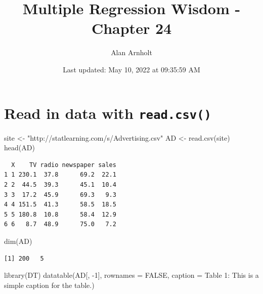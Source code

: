 \documentclass[
]{article}
\title{Multiple Regression Wisdom - Chapter 24}
\author{Alan Arnholt}
\date{Last updated: May 10, 2022 at 09:35:59 AM}
\newenvironment{Shaded}{\begin{snugshade}}{\end{snugshade}}
\newcommand{\AttributeTok}[1]{\textcolor[rgb]{0.77,0.63,0.00}{#1}}
\newcommand{\ConstantTok}[1]{\textcolor[rgb]{0.00,0.00,0.00}{#1}}
\newcommand{\DecValTok}[1]{\textcolor[rgb]{0.00,0.00,0.81}{#1}}
\newcommand{\FunctionTok}[1]{\textcolor[rgb]{0.00,0.00,0.00}{#1}}
\newcommand{\NormalTok}[1]{#1}
\newcommand{\OtherTok}[1]{\textcolor[rgb]{0.56,0.35,0.01}{#1}}
\newcommand{\SpecialCharTok}[1]{\textcolor[rgb]{0.00,0.00,0.00}{#1}}
\newcommand{\StringTok}[1]{\textcolor[rgb]{0.31,0.60,0.02}{#1}}
\begin{document}
\maketitle

{
\setcounter{tocdepth}{2}
\tableofcontents
}
\hypertarget{read-in-data-with-read.csv}{%
\section{\texorpdfstring{Read in data with \texttt{read.csv()}}{Read in data with read.csv()}}\label{read-in-data-with-read.csv}}

\begin{Shaded}
\begin{Highlighting}[]
\NormalTok{site }\OtherTok{\textless{}{-}} \StringTok{"http://statlearning.com/s/Advertising.csv"}
\NormalTok{AD }\OtherTok{\textless{}{-}} \FunctionTok{read.csv}\NormalTok{(site)}
\FunctionTok{head}\NormalTok{(AD)}
\end{Highlighting}
\end{Shaded}

\begin{verbatim}
  X    TV radio newspaper sales
1 1 230.1  37.8      69.2  22.1
2 2  44.5  39.3      45.1  10.4
3 3  17.2  45.9      69.3   9.3
4 4 151.5  41.3      58.5  18.5
5 5 180.8  10.8      58.4  12.9
6 6   8.7  48.9      75.0   7.2
\end{verbatim}

\begin{Shaded}
\begin{Highlighting}[]
\FunctionTok{dim}\NormalTok{(AD)}
\end{Highlighting}
\end{Shaded}

\begin{verbatim}
[1] 200   5
\end{verbatim}

\begin{Shaded}
\begin{Highlighting}[]
\FunctionTok{library}\NormalTok{(DT)}
\FunctionTok{datatable}\NormalTok{(AD[, }\SpecialCharTok{{-}}\DecValTok{1}\NormalTok{], }\AttributeTok{rownames =} \ConstantTok{FALSE}\NormalTok{,}
          \AttributeTok{caption =} \StringTok{\textquotesingle{}Table 1: This is a simple caption for the table.\textquotesingle{}}\NormalTok{) }
\end{Highlighting}
\end{Shaded}
\end{document}
